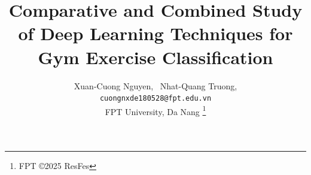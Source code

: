 \documentclass[journal,onecolumn, 11pt]{IEEEtran}
\begin{document}
%
\title{Comparative and Combined Study of Deep Learning Techniques for Gym Exercise Classification}
%
%
%

\author{Xuan-Cuong Nguyen,%
        ~Nhat-Quang Truong,%
        

\texttt{cuongnxde180528@fpt.edu.vn} \\
FPT University, Da Nang
\thanks{FPT \copyright2025 ResFes}
}

% 
%
\end{document}
